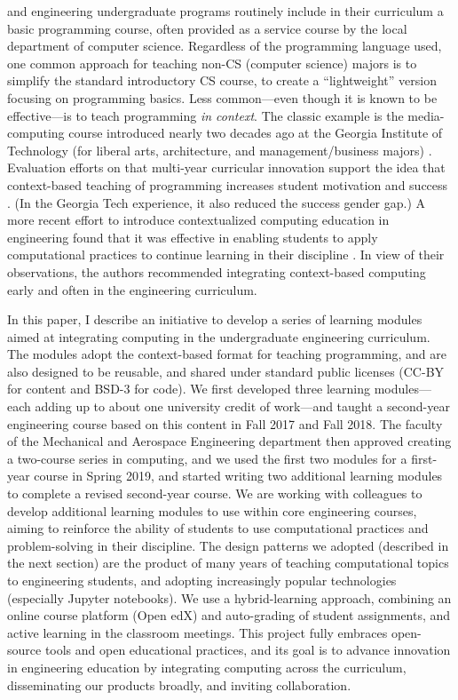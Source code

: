\documentclass[10pt,journal,compsoc]{IEEEtran}
\begin{document}
 and engineering undergraduate programs routinely include in their curriculum a basic programming course, often provided as a service course by the local department of computer science. 
Regardless of the programming language used, one common approach for teaching non-CS (computer science) majors is to simplify the standard introductory CS course, to create a ``lightweight'' version focusing on programming basics. 
Less common---even though it is known to be effective---is to teach programming \emph{in context}. 
The classic example is the media-computing course introduced nearly two decades ago at the Georgia Institute of Technology (for liberal arts, architecture, and management/business majors) \cite{guzdial2003media,guzdial2005design}. 
Evaluation efforts on that multi-year curricular innovation support the idea that context-based teaching of programming increases student motivation and success \cite{forte2005motivation,guzdial2013exploring}. 
(In the Georgia Tech experience, it also reduced the success gender gap.) 
A more recent effort to introduce contextualized computing education in engineering found that it was effective in enabling students to apply computational practices to continue learning in their discipline \cite{magana2016case}. 
In view of their observations, the authors recommended integrating context-based computing early and often in the engineering curriculum. 

In this paper, I describe an initiative to develop a series of learning modules aimed at integrating computing in the undergraduate engineering curriculum. 
The modules adopt the context-based format for teaching programming, and are also designed to be reusable, and shared under standard public licenses (CC-BY for content and BSD-3 for code). 
We first developed three learning modules---each adding up to about one university credit of work---and taught a second-year engineering course based on this content  in Fall 2017 and Fall 2018. 
The faculty of the Mechanical and Aerospace Engineering department then approved creating a two-course series in computing, and we used the first two modules for a first-year course in Spring 2019, and started writing two additional learning modules to complete a revised second-year course. 
We are working with colleagues to develop additional learning modules to use within core engineering courses, aiming to reinforce the ability of students to use computational practices and problem-solving in their discipline. 
The design patterns we adopted (described in the next section) are the product of many years of teaching computational topics to engineering students, and adopting increasingly popular technologies (especially Jupyter notebooks). 
We use a hybrid-learning approach, combining an online course platform (Open edX) and auto-grading of student assignments, and active learning in the classroom meetings. 
This project fully embraces open-source tools and open educational practices, and its goal is to advance innovation in engineering education by integrating computing across the curriculum, disseminating our products broadly, and inviting collaboration.
\end{document}
